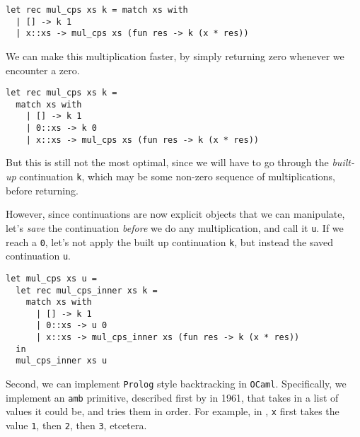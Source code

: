 \begin{code}
\label{code:mul-ocaml-fast}
\begin{verbatim}
let rec mul_cps xs k = match xs with
  | [] -> k 1
  | x::xs -> mul_cps xs (fun res -> k (x * res))
\end{verbatim}
\end{code}

We can make this multiplication faster, by simply returning zero whenever we encounter a zero. 

\begin{code}
\label{code:mul-ocaml-faster}
\begin{verbatim}
let rec mul_cps xs k = 
  match xs with
    | [] -> k 1
    | 0::xs -> k 0
    | x::xs -> mul_cps xs (fun res -> k (x * res))
\end{verbatim}
\end{code}

But this is still not the most optimal, since we will have to go through the \emph{built-up} continuation \texttt{k}, which may be some non-zero sequence of multiplications, before returning. 

However, since continuations are now explicit objects that we can manipulate, let's \emph{save} the continuation \emph{before} we do any multiplication, and call it \texttt{u}. If we reach a \texttt{0}, let's not apply the built up continuation \texttt{k}, but instead the saved continuation \texttt{u}.

\begin{code}
\label{code:mul-ocaml-fastest}
\begin{verbatim}
let mul_cps xs u = 
  let rec mul_cps_inner xs k = 
    match xs with
      | [] -> k 1
      | 0::xs -> u 0
      | x::xs -> mul_cps_inner xs (fun res -> k (x * res))
  in
  mul_cps_inner xs u
\end{verbatim}
\end{code}

Second, we can implement \texttt{Prolog} style backtracking in \texttt{OCaml}. Specifically, we implement an \texttt{amb} primitive, described first by \citet{mccarthy-1963} in 1961, that takes in a list of values it could be, and tries them in order. For example, in , \texttt{x} first takes the value \texttt{1}, then \texttt{2}, then \texttt{3}, etcetera.

